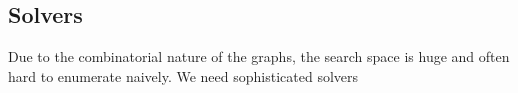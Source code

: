 

\subsection{Solvers}
Due to the combinatorial nature of the graphs, the search space is huge
and often hard to enumerate naively.
%
We need sophisticated solvers 

